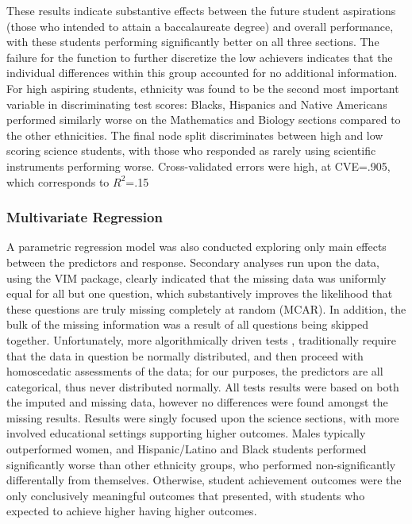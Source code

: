 \documentclass{article}\usepackage[]{graphicx}\usepackage[]{color}
\begin{document}
These results indicate substantive effects between the future student aspirations (those who intended to attain a baccalaureate degree) and overall performance, with these students performing significantly better on all three sections. The failure for the function to further discretize the low achievers indicates that the individual differences within this group accounted for no additional information. For high aspiring students, ethnicity was found to be the second most important variable in discriminating test scores: Blacks, Hispanics and Native Americans performed similarly worse on the Mathematics and Biology sections compared to the other ethnicities. The final node split discriminates between high and low scoring science students, with those who responded as rarely using scientific instruments performing worse. Cross-validated errors were high, at CVE=.905, which corresponds to $R^2$=.15

\subsubsection{Multivariate Regression}
A parametric regression model was also conducted exploring only main effects between the predictors and response. Secondary analyses run upon the data, using the VIM package, clearly indicated that the missing data was uniformly equal for all but one question, which substantively improves the likelihood that these questions are truly missing completely at random (MCAR). In addition, the bulk of the missing information was a result of all questions being skipped together. Unfortunately, more algorithmically driven tests \cite{little,KB}, traditionally require that the data in question be normally distributed, and then proceed with homoscedatic assessments of the data; for our purposes, the predictors are all categorical, thus never distributed normally. All tests results were based on both the imputed and missing data, however no differences were found amongst the missing results. Results were singly focused upon the science sections, with more involved educational settings supporting higher outcomes. Males typically outperformed women, and Hispanic/Latino and Black students performed significantly worse than other ethnicity groups, who performed non-significantly differentally from themselves. Otherwise, student achievement outcomes were the only conclusively meaningful outcomes that presented, with students who expected to achieve higher having higher outcomes.
\end{document}
